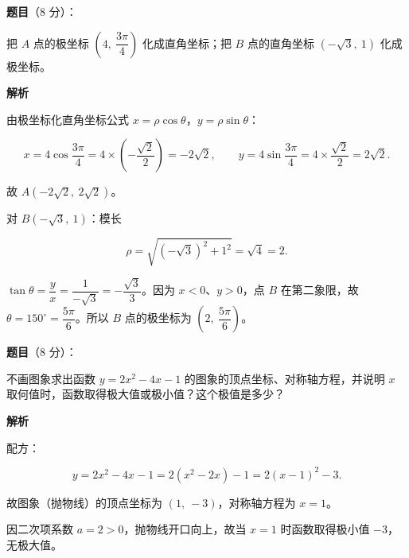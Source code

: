 \begin{answer}

\textbf{题目}（8 分）：

把 $A$ 点的极坐标 $\left(4,\ \dfrac{3\pi}{4}\right)$ 化成直角坐标；把 $B$ 点的直角坐标 $(-\sqrt{3},\ 1)$ 化成极坐标。

\textbf{解析}

由极坐标化直角坐标公式 $x=\rho\cos\theta$，$y=\rho\sin\theta$：

\nopagebreak[4]
\[
x=4\cos\frac{3\pi}{4}=4\times\left(-\frac{\sqrt{2}}{2}\right)=-2\sqrt{2},
\qquad
y=4\sin\frac{3\pi}{4}=4\times\frac{\sqrt{2}}{2}=2\sqrt{2}.
\]

故 $A(-2\sqrt{2},\ 2\sqrt{2})$。

对 $B(-\sqrt{3},\ 1)$：模长

\nopagebreak[4]
\[
\rho=\sqrt{(-\sqrt{3})^{2}+1^{2}}=\sqrt{4}=2.
\]

$\tan\theta=\dfrac{y}{x}=\dfrac{1}{-\sqrt{3}}=-\dfrac{\sqrt{3}}{3}$。因为 $x<0$、$y>0$，点 $B$ 在第二象限，故 $\theta=150^\circ=\dfrac{5\pi}{6}$。所以 $B$ 点的极坐标为 $\left(2,\ \dfrac{5\pi}{6}\right)$。


\end{answer}
\begin{answer}

\textbf{题目}（8 分）：

不画图象求出函数 $y=2x^{2}-4x-1$ 的图象的顶点坐标、对称轴方程，并说明 $x$ 取何值时，函数取得极大值或极小值？这个极值是多少？

\textbf{解析}

配方：

\nopagebreak[4]
\[
y=2x^{2}-4x-1=2\left(x^{2}-2x\right)-1=2(x-1)^{2}-3.
\]

故图象（抛物线）的顶点坐标为 $(1,\ -3)$，对称轴方程为 $x=1$。

因二次项系数 $a=2>0$，抛物线开口向上，故当 $x=1$ 时函数取得极小值 $-3$，无极大值。


\end{answer}
